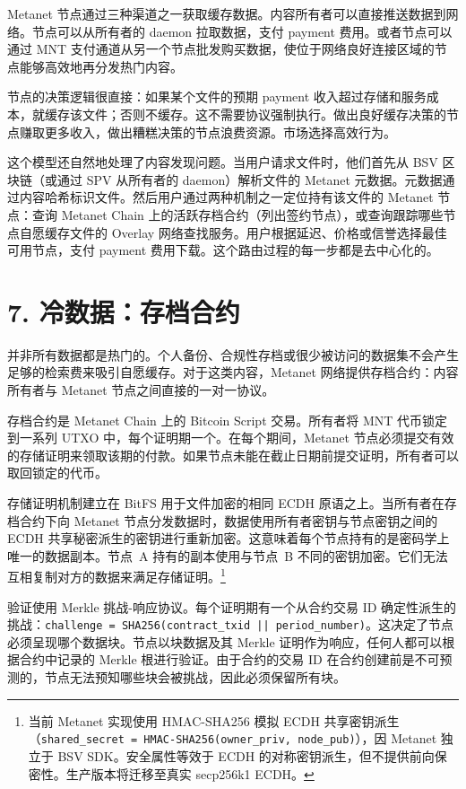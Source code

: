 \documentclass[11pt,a4paper]{article}
\begin{document}
Metanet 节点通过三种渠道之一获取缓存数据。内容所有者可以直接推送数据到网络。节点可以从所有者的 daemon 拉取数据，支付 payment 费用。或者节点可以通过 MNT 支付通道从另一个节点批发购买数据，使位于网络良好连接区域的节点能够高效地再分发热门内容。

节点的决策逻辑很直接：如果某个文件的预期 payment 收入超过存储和服务成本，就缓存该文件；否则不缓存。这不需要协议强制执行。做出良好缓存决策的节点赚取更多收入，做出糟糕决策的节点浪费资源。市场选择高效行为。

这个模型还自然地处理了内容发现问题。当用户请求文件时，他们首先从 BSV 区块链（或通过 SPV 从所有者的 daemon）解析文件的 Metanet 元数据。元数据通过内容哈希标识文件。然后用户通过两种机制之一定位持有该文件的 Metanet 节点：查询 Metanet Chain 上的活跃存档合约（列出签约节点），或查询跟踪哪些节点自愿缓存文件的 Overlay 网络查找服务。用户根据延迟、价格或信誉选择最佳可用节点，支付 payment 费用下载。这个路由过程的每一步都是去中心化的。

\section{7. 冷数据：存档合约}

并非所有数据都是热门的。个人备份、合规性存档或很少被访问的数据集不会产生足够的检索费来吸引自愿缓存。对于这类内容，Metanet 网络提供存档合约：内容所有者与 Metanet 节点之间直接的一对一协议。

存档合约是 Metanet Chain 上的 Bitcoin Script 交易。所有者将 MNT 代币锁定到一系列 UTXO 中，每个证明期一个。在每个期间，Metanet 节点必须提交有效的存储证明来领取该期的付款。如果节点未能在截止日期前提交证明，所有者可以取回锁定的代币。

存储证明机制建立在 BitFS 用于文件加密的相同 ECDH 原语之上。当所有者在存档合约下向 Metanet 节点分发数据时，数据使用所有者密钥与节点密钥之间的 ECDH 共享秘密派生的密钥进行重新加密。这意味着每个节点持有的是密码学上唯一的数据副本。节点~A 持有的副本使用与节点~B 不同的密钥加密。它们无法互相复制对方的数据来满足存储证明。\footnote{当前 Metanet 实现使用 HMAC-SHA256 模拟 ECDH 共享密钥派生（\texttt{shared\_secret = HMAC-SHA256(owner\_priv, node\_pub)}），因 Metanet 独立于 BSV SDK。安全属性等效于 ECDH 的对称密钥派生，但不提供前向保密性。生产版本将迁移至真实 secp256k1 ECDH。}

验证使用 Merkle 挑战-响应协议。每个证明期有一个从合约交易 ID 确定性派生的挑战：\texttt{challenge = SHA256(contract\_txid || period\_number)}。这决定了节点必须呈现哪个数据块。节点以块数据及其 Merkle 证明作为响应，任何人都可以根据合约中记录的 Merkle 根进行验证。由于合约的交易 ID 在合约创建前是不可预测的，节点无法预知哪些块会被挑战，因此必须保留所有块。
\end{document}
